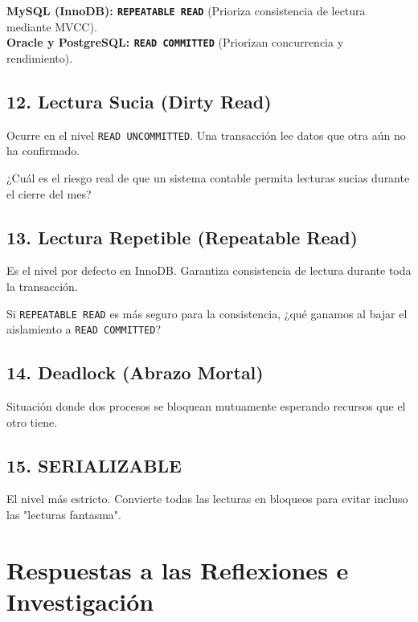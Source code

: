 \documentclass[12pt,a4paper]{article}
\begin{document}
\begin{tcolorbox}[title=Duelo de Motores: Valores por Defecto]
\textbf{MySQL (InnoDB): \texttt{REPEATABLE READ}} (Prioriza consistencia de lectura mediante MVCC). \\
\textbf{Oracle y PostgreSQL: \texttt{READ COMMITTED}} (Priorizan concurrencia y rendimiento).
\end{tcolorbox}

\subsection{12. Lectura Sucia (Dirty Read)}
Ocurre en el nivel \texttt{READ UNCOMMITTED}. Una transacción lee datos que otra aún no ha confirmado.


\begin{tcolorbox}[title=Reflexión 12]
¿Cuál es el riesgo real de que un sistema contable permita lecturas sucias durante el cierre del mes?
\end{tcolorbox}

\subsection{13. Lectura Repetible (Repeatable Read)}
Es el nivel por defecto en InnoDB. Garantiza consistencia de lectura durante toda la transacción.


\begin{tcolorbox}[title=Reflexión 13]
Si \texttt{REPEATABLE READ} es más seguro para la consistencia, ¿qué ganamos al bajar el aislamiento a \texttt{READ COMMITTED}?
\end{tcolorbox}

\subsection{14. Deadlock (Abrazo Mortal)}
Situación donde dos procesos se bloquean mutuamente esperando recursos que el otro tiene.


\subsection{15. SERIALIZABLE}
El nivel más estricto. Convierte todas las lecturas en bloqueos para evitar incluso las "lecturas fantasma".


\newpage
\section{Respuestas a las Reflexiones e Investigación}
\end{document}
